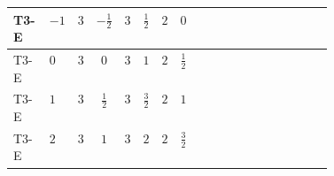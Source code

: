 \documentclass[8pt]{article}
\begin{document}
\begin{landscape}
\begin{longtable}{@{}llcccccc >{\raggedright\arraybackslash}p{0.21\linewidth} >{\raggedright\arraybackslash}p{0.21\linewidth}@{}}
\midrule
T3-E & $-1$ & $3$ & $-\frac{1}{2}$ & $3$ & $\frac{1}{2}$ & $2$ & $0$ & \scriptsize\adjustbox{max width=\linewidth}{$\begin{gathered} 6 C_{5} Y_d Y_d^\dagger\end{gathered}$} & \scriptsize\adjustbox{max width=\linewidth}{$\begin{gathered} 6 C_{5} Y_u Y_u^\dagger\end{gathered}$} \\
\midrule
T3-E & $0$ & $3$ & $0$ & $3$ & $1$ & $2$ & $\frac{1}{2}$ & \scriptsize\adjustbox{max width=\linewidth}{$\begin{gathered} 6 C_{5} Y_d Y_d^\dagger\end{gathered}$} & \scriptsize\adjustbox{max width=\linewidth}{$\begin{gathered} 6 C_{5} Y_u Y_u^\dagger\end{gathered}$} \\
\midrule
T3-E & $1$ & $3$ & $\frac{1}{2}$ & $3$ & $\frac{3}{2}$ & $2$ & $1$ & \scriptsize\adjustbox{max width=\linewidth}{$\begin{gathered} 6 C_{5} Y_d Y_d^\dagger\end{gathered}$} & \scriptsize\adjustbox{max width=\linewidth}{$\begin{gathered} 6 C_{5} Y_u Y_u^\dagger\end{gathered}$} \\
\midrule
T3-E & $2$ & $3$ & $1$ & $3$ & $2$ & $2$ & $\frac{3}{2}$ & \scriptsize\adjustbox{max width=\linewidth}{$\begin{gathered} 6 C_{5} Y_d Y_d^\dagger\end{gathered}$} & \scriptsize\adjustbox{max width=\linewidth}{$\begin{gathered} 6 C_{5} Y_u Y_u^\dagger\end{gathered}$} \\
\midrule
\bottomrule
\end{longtable}
\end{landscape}
\end{document}
